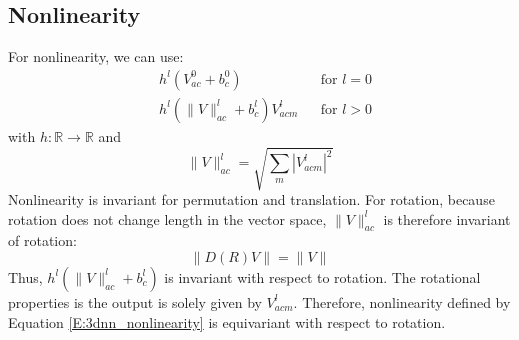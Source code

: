 \documentclass{article}
\begin{document}
\subsection*{Nonlinearity}
For nonlinearity, we can use:
\begin{align*}
    &h^l (V_{ac}^0 + b_c^0) & &\text{for $l=0$} \\ 
    &h^l (\|V\|_{ac}^l + b_c^l)V_{acm}^{l} &  &\text{for $l>0$} \label{E:3dnn_nonlinearity}
\end{align*}
with $h\colon \mathbb{R}\to \mathbb{R}$ and 
\[ \|V\|_{ac}^l = \sqrt{\sum_m |V_{acm}^l|^2} \]
Nonlinearity is invariant for permutation and translation. For rotation, 
because rotation does not change length in the vector space, $\|V\|_{ac}^l$ is 
therefore invariant of rotation:
\begin{equation}
    \|D(R)V\| = \|V\|
\end{equation}
Thus, $h^l (\|V\|_{ac}^l + b_c^l)$ is invariant with respect to rotation. 
The rotational properties is the output is solely given by $V_{acm}^{l}$.
Therefore, nonlinearity defined by Equation \eqref{E:3dnn_nonlinearity} is equivariant
with respect to rotation.
\end{document}
